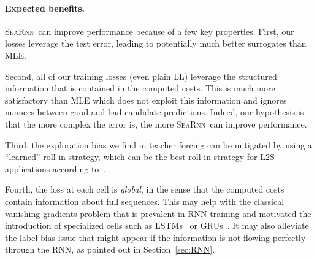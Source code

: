 \documentclass{article}
\newcommand{\SEARNN}{\textsc{SeaRnn}}
\begin{document}
	\vspace{-1mm}
	\paragraph{Expected benefits.}
	\SEARNN\ can improve performance because of a few key properties.
	First, our losses leverage the test error, leading to potentially much better surrogates than MLE.

	Second, all of our training losses (even plain LL) leverage the structured information that is contained in the computed costs.
	This is much more satisfactory than MLE which does not exploit this information and ignores nuances between good and bad candidate predictions.
	Indeed, our hypothesis is that the more complex the error is, the more \SEARNN\ can improve performance.

	Third, the exploration bias we find in teacher forcing can be mitigated by using a ``learned'' roll-in strategy, which can be the best roll-in strategy for L2S applications according to~\citet{Chang2015}.

	Fourth, the loss at each cell is \textit{global}, in the sense that the computed costs contain information about full sequences.
	This may help with the classical vanishing gradients problem that is prevalent in RNN training and motivated the introduction of specialized cells such as LSTMs~\citep{Hochreiter1997} or GRUs~\citep{Cho2014}.
	It may also alleviate the label bias issue that might appear if the information is not flowing perfectly through the RNN, as pointed out in Section~\ref{sec:RNN}.
\end{document}
